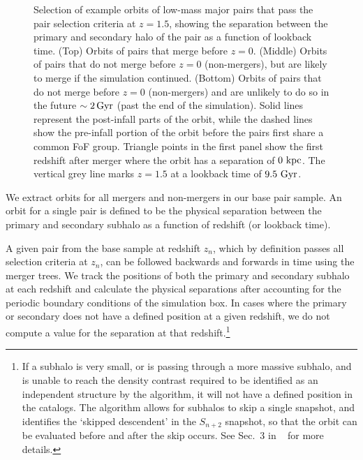 \documentclass[twocolumn,linenumbers]{aastex631}
\begin{document}
\begin{figure}[tb]
\begin{center}
    \caption{Selection of example orbits of low-mass major pairs that pass the pair selection criteria at $z=1.5$, showing the separation between the primary and secondary halo of the pair as a function of lookback time. 
    (Top) Orbits of pairs that merge before $z=0$.
    (Middle) Orbits of pairs that do not merge before $z=0$ (non-mergers), but are likely to merge if the simulation continued. 
    (Bottom) Orbits of pairs that do not merge before $z=0$ (non-mergers) and are unlikely to do so in the future $\sim2\mathrm{\,Gyr}$ (past the end of the simulation).
    Solid lines represent the post-infall parts of the orbit, while the dashed lines show the pre-infall portion of the orbit before the pairs first share a common FoF group. 
    Triangle points in the first panel show the first redshift after merger where the orbit has a separation of $0\,\mathrm{\,kpc}$.
    The vertical grey line marks $z=1.5$ at a lookback time of $9.5\,\mathrm{\,Gyr}$. 
    }
    \label{fig:example-orbits}
    \end{center}
\end{figure}

We extract orbits for all mergers and non-mergers in our base pair sample. 
An orbit for a single pair is defined to be the physical separation between the primary and secondary subhalo as a function of redshift (or lookback time). 

A given pair from the base sample at redshift $z_n$, which by definition passes all selection criteria at $z_n$, can be followed backwards and forwards in time using the \sublink{} merger trees.  
We track the positions of both the primary and secondary subhalo at each redshift and calculate the physical separations after accounting for the periodic boundary conditions of the simulation box.
In cases where the primary or secondary does not have a defined position at a given redshift, we do not compute a value for the separation at that redshift.\footnote{If a subhalo is very small, or is passing through a more massive subhalo, and is unable to reach the density contrast required to be identified as an independent structure by the \subfind{} algorithm, it will not have a defined position in the \sublink{} catalogs. The \sublink{} algorithm allows for subhalos to skip a single snapshot, and identifies the `skipped descendent' in the $S_{n+2}$ snapshot, so that the orbit can be evaluated before and after the skip occurs. See Sec.~3 in ~\citet{RG2015} for more details.}
\end{document}
